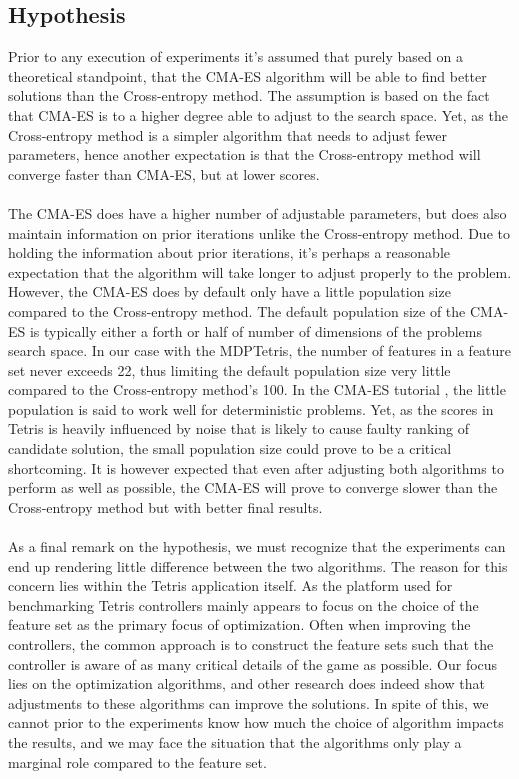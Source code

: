 \subsection{Hypothesis}

Prior to any execution of experiments it's assumed that purely based 
on a theoretical standpoint, that the CMA-ES algorithm will be able to 
find better solutions than the Cross-entropy method. The assumption is based 
on the fact that CMA-ES is to a higher degree able to adjust to the 
search space. Yet, as the Cross-entropy method is a simpler algorithm that needs 
to adjust fewer parameters, hence another expectation is that the Cross-entropy
method will converge faster than CMA-ES, but at lower scores.\\
\\
The CMA-ES does have a higher number of adjustable parameters, but does also
maintain information on prior iterations unlike the Cross-entropy method.
Due to holding the information about prior iterations, it's perhaps a reasonable
expectation that the algorithm will take longer to adjust properly to the
problem. However, the CMA-ES does by default only have a little population size 
compared to the Cross-entropy method. The default population size of the CMA-ES is
typically either a forth or half of number of dimensions of the problems search space.
In our case with the MDPTetris, the number of features in a feature set never exceeds
22,
thus limiting the default population size very little compared to the Cross-entropy method's 
100. In the CMA-ES tutorial \citep{hansen2011}, the little population is said to
work well for deterministic problems. Yet, as the scores in Tetris is heavily
influenced by noise that is likely to cause faulty ranking of candidate solution,
the small population size could prove to be a critical shortcoming.
It is however expected that even after adjusting both algorithms to perform as 
well as possible, the CMA-ES will prove to converge slower than the Cross-entropy method but
with better final results.\\
\\
As a final remark on the hypothesis, we must recognize that the experiments can 
end up rendering little difference between the two algorithms. The reason for 
this concern lies within the Tetris application itself. As the platform used for benchmarking 
Tetris controllers mainly appears to focus on the choice of the feature set as the primary
focus of optimization. Often when improving the controllers, the common approach is to
construct the feature sets such that the controller is aware of as many critical 
details of the game as possible. Our focus lies on the optimization algorithms,
and other research does indeed show that adjustments to these algorithms can 
improve the solutions. In spite of this, we cannot prior to the experiments know how much
the choice of algorithm impacts the results, and we may face the situation that 
the algorithms only play a marginal role compared to the feature set.
